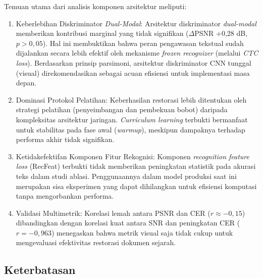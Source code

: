 \documentclass[12pt,a4paper]{article}
\begin{document}
Temuan utama dari analisis komponen arsitektur meliputi:
\begin{enumerate}[leftmargin=1.5em, labelsep=0.5em, itemindent=0pt, noitemsep, topsep=0pt, partopsep=0pt]
  \item Keberlebihan Diskriminator \textit{Dual-Modal}: Arsitektur diskriminator \textit{dual-modal} memberikan kontribusi marginal yang tidak signifikan ($\Delta$PSNR +0,28 dB, $p>0,05$). Hal ini membuktikan bahwa peran pengawasan tekstual sudah dijalankan secara lebih efektif oleh mekanisme \textit{frozen recognizer} (melalui \textit{CTC loss}). Berdasarkan prinsip parsimoni, arsitektur diskriminator CNN tunggal (visual) direkomendasikan sebagai acuan efisiensi untuk implementasi masa depan.
  \item Dominasi Protokol Pelatihan: Keberhasilan restorasi lebih ditentukan oleh strategi pelatihan (penyeimbangan dan pembekuan bobot) daripada kompleksitas arsitektur jaringan. \textit{Curriculum learning} terbukti bermanfaat untuk stabilitas pada fase awal (\textit{warmup}), meskipun dampaknya terhadap performa akhir tidak signifikan.
  \item Ketidakefektifan Komponen Fitur Rekognisi: Komponen \textit{recognition feature loss} (RecFeat) terbukti tidak memberikan peningkatan statistik pada akurasi teks dalam studi ablasi. Penggunaannya dalam model produksi saat ini merupakan sisa eksperimen yang dapat dihilangkan untuk efisiensi komputasi tanpa mengorbankan performa.
  \item Validasi Multimetrik: Korelasi lemah antara PSNR dan CER ($r \approx -0,15$) dibandingkan dengan korelasi kuat antara SNR dan peningkatan CER ($r = -0,963$) menegaskan bahwa metrik visual saja tidak cukup untuk mengevaluasi efektivitas restorasi dokumen sejarah.
\end{enumerate}

\subsection{Keterbatasan}
\label{subsec:keterbatasan}
\end{document}
